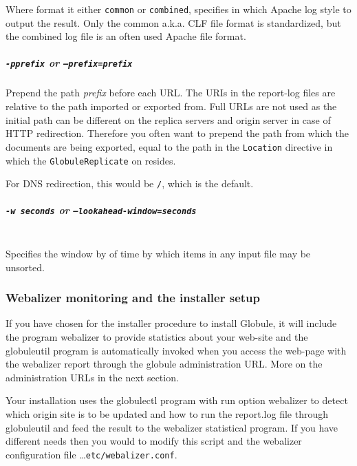 \documentclass[10pt,a4paper]{article}
\makeatletter
\newenvironment{p}{\@open{P}{}}{\@close{P}}
\newenvironment{p}{}{\par}
\makeatother
\begin{document}
\begin{p}
Where format it either \texttt{common} or \texttt{combined}, specifies in
which Apache log style to output the result.  Only the common a.k.a. CLF file
format is standardized, but the combined log file is an often used Apache file
format.
\end{p}

\subparagraph*{\texttt{-p\textit{prefix}} or \texttt{--prefix=\textit{prefix}}}

\begin{p}
Prepend the path \textit{prefix} before each URL.  The URIs in the report-log
files are relative to the path imported or exported from.  Full URLs are not
used as the initial path can be different on the replica servers and origin
server in case of HTTP redirection.  Therefore you often want to prepend the
path from which the documents are being exported, equal to the path in the
\texttt{Location} directive in which the \verb!GlobuleReplicate! on resides.
\end{p}

\begin{p}
For DNS redirection, this would be \texttt{/}, which is the default.
\end{p}

\subparagraph*{\texttt{-w \textit{seconds}} or
  \texttt{--lookahead-window=\textit{seconds}}}~\\

\begin{p}
Specifies the window by of time by which items in any input file may be
unsorted.
\end{p}

\subsubsection{Webalizer monitoring and the installer setup}

\begin{p}
If you have chosen for the installer procedure to install Globule, it will
include the program webalizer to provide statistics about your web-site and
the globuleutil program is automatically invoked when you access the web-page
with the webalizer report through the globule administration URL.  More on the
administration URLs in the next section.
\end{p}

\begin{p}
Your installation uses the globulectl program with run option webalizer to
detect which origin site is to be updated and how to run the
report.log file through globuleutil and feed the result to the webalizer
statistical program.  If you have different needs then you would to modify
this script and the webalizer configuration file
\ldots\verb!etc/webalizer.conf!.
\end{p}
\end{document}
